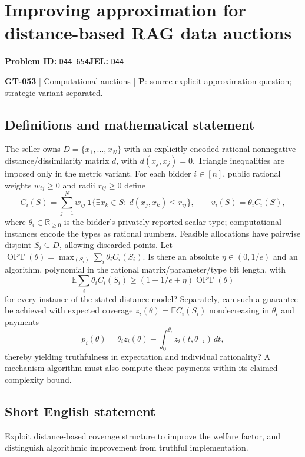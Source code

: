 \documentclass[11pt,a4paper]{article}
\begin{document}
\section*{Improving approximation for distance-based RAG data auctions}
\textbf{Problem ID:} \texttt{D44-654}\quad \textbf{JEL:} \texttt{D44}\par
\label{problem:OP-0183}
\label{game:GT-053}
{\sffamily\small\color{muted}
\textbf{GT-053} | Computational auctions | \textbf{P}: source-explicit approximation question; strategic variant separated.
\par}
\subsection*{Definitions and mathematical statement}
The seller owns $D=\{x_1,\ldots,x_N\}$ with an explicitly encoded rational nonnegative distance/dissimilarity matrix $d$, with $d(x_j,x_j)=0$. Triangle inequalities are imposed only in the metric variant. For each bidder $i\in[n]$, public rational weights $w_{ij}\geq0$ and radii $r_{ij}\geq0$ define
\[
 C_i(S)=\sum_{j=1}^N w_{ij}\,\mathbf1\{\exists x_k\in S:\ d(x_j,x_k)\leq r_{ij}\},
 \qquad v_i(S)=\theta_i C_i(S),
\]
where $\theta_i\in\mathbb R_{\geq0}$ is the bidder's privately reported scalar type; computational instances encode the types as rational numbers. Feasible allocations have pairwise disjoint $S_i\subseteq D$, allowing discarded points. Let $\operatorname{OPT}(\theta)=\max_{(S_i)}\sum_i\theta_i C_i(S_i)$. Is there an absolute $\eta\in(0,1/e)$ and an algorithm, polynomial in the rational matrix/parameter/type bit length, with
\[
 \mathbb E\sum_i\theta_iC_i(S_i)\geq(1-1/e+\eta)\operatorname{OPT}(\theta)
\]
for every instance of the stated distance model? Separately, can such a guarantee be achieved with expected coverage $z_i(\theta)=\mathbb E C_i(S_i)$ nondecreasing in $\theta_i$ and payments
\[
 p_i(\theta)=\theta_i z_i(\theta)-\int_0^{\theta_i}z_i(t,\theta_{-i})\,dt,
\]
thereby yielding truthfulness in expectation and individual rationality? A mechanism algorithm must also compute these payments within its claimed complexity bound.
\subsection*{Short English statement}
Exploit distance-based coverage structure to improve the welfare factor, and distinguish algorithmic improvement from truthful implementation.
\end{document}
